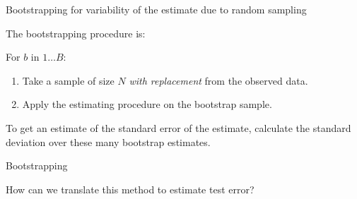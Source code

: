 \documentclass[xcolor={table}, handout]{beamer}
\begin{document}
\begin{frame}{Bootstrapping for variability of the estimate due to random sampling}


The bootstrapping procedure is:

\begin{wideitemize}
\item For $b$ in $1\dots B$:
\begin{enumerate}

    \item Take a sample of size $N$  \textit{with replacement} from the observed data.\pause

    \item Apply the estimating procedure on the bootstrap sample.%
    \end{enumerate}
\pause

\item To get an estimate of the standard error of the estimate, calculate the standard deviation over these many bootstrap estimates.
\end{wideitemize}

\end{frame}





\begin{frame}{Bootstrapping}

\begin{wideitemize}
\item How can we translate this method to estimate test error?
\end{wideitemize}

\end{frame}


\end{document}
